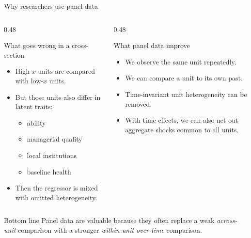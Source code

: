 \documentclass[10pt]{beamer}
\begin{document}
\begin{frame}{Why researchers use panel data}
\small
\begin{columns}[T]
\begin{column}{0.48\textwidth}
\begin{block}{What goes wrong in a cross-section}
\begin{itemize}
  \item High-$x$ units are compared with low-$x$ units.
  \item But those units also differ in latent traits:
  \begin{itemize}
    \item ability
    \item managerial quality
    \item local institutions
    \item baseline health
  \end{itemize}
  \item Then the regressor is mixed with omitted heterogeneity.
\end{itemize}
\end{block}
\end{column}
\begin{column}{0.48\textwidth}
\begin{exampleblock}{What panel data improve}
\begin{itemize}
  \item We observe the same unit repeatedly.
  \item We can compare a unit to its own past.
  \item Time-invariant unit heterogeneity can be removed.
  \item With time effects, we can also net out aggregate shocks common to all units.
\end{itemize}
\end{exampleblock}
\end{column}
\end{columns}

\pause
\begin{alertblock}{Bottom line}
Panel data are valuable because they often replace a weak \emph{across-unit} comparison with a stronger \emph{within-unit over time} comparison.
\end{alertblock}
\end{frame}
\end{document}
